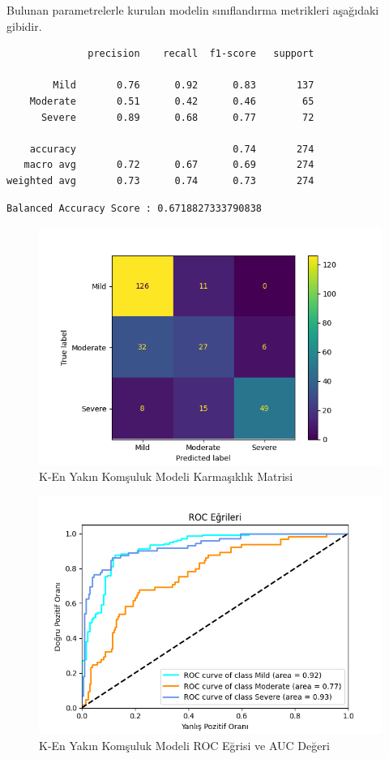 \documentclass[12pt,twoside]{deuthesis}
\begin{document}
Bulunan parametrelerle kurulan modelin sınıflandırma metrikleri aşağıdaki gibidir.
\begin{verbatim}
              precision    recall  f1-score   support

        Mild       0.76      0.92      0.83       137
    Moderate       0.51      0.42      0.46        65
      Severe       0.89      0.68      0.77        72

    accuracy                           0.74       274
   macro avg       0.72      0.67      0.69       274
weighted avg       0.73      0.74      0.73       274
\end{verbatim}
\begin{verbatim}
Balanced Accuracy Score : 0.6718827333790838
\end{verbatim}
\begin{figure}

{\centering \includegraphics[width=1.05\linewidth,height=0.6\textheight]{figure/knn_conf} 

}

\caption{K-En Yakın Komşuluk Modeli Karmaşıklık Matrisi}\label{fig:unnamed-chunk-19}
\end{figure}
\begin{figure}

{\centering \includegraphics[width=1.05\linewidth,height=0.6\textheight]{figure/roc_curve_KNeighborsClassifier} 

}

\caption{K-En Yakın Komşuluk Modeli ROC Eğrisi ve AUC Değeri}\label{fig:unnamed-chunk-20}
\end{figure}
\end{document}
